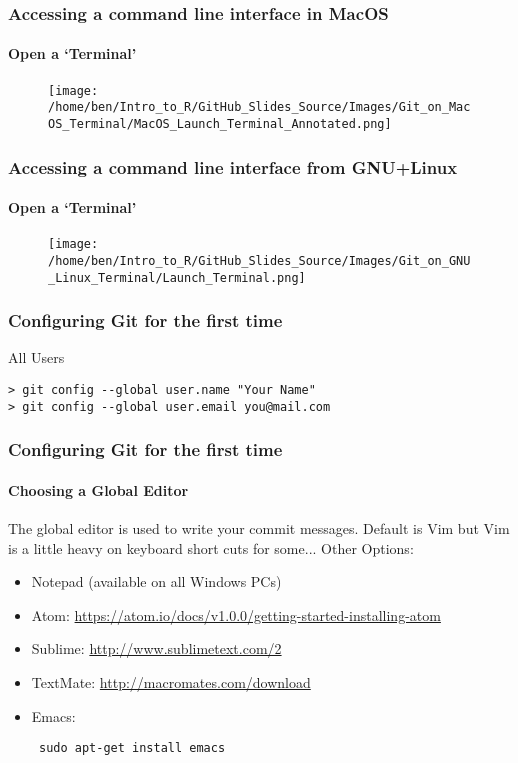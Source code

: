 \documentclass[xcolor=dvipsnames]{beamer}
\begin{document}
\begin{frame}
\frametitle{Accessing a command line interface in MacOS}
\framesubtitle{Open a `Terminal'}
\begin{center}
\begin{figure}
\texttt{[image: /home/ben/Intro\_to\_R/GitHub\_Slides\_Source/Images/Git\_on\_MacOS\_Terminal/MacOS\_Launch\_Terminal\_Annotated.png]} 
\end{figure}
\end{center}
\end{frame}

\begin{frame}
\frametitle{Accessing a command line interface from GNU+Linux}
\framesubtitle{Open a `Terminal'}
\begin{center}
\begin{figure}
\texttt{[image: /home/ben/Intro\_to\_R/GitHub\_Slides\_Source/Images/Git\_on\_GNU\_Linux\_Terminal/Launch\_Terminal.png]}
\end{figure}
\end{center}
\end{frame}

\begin{frame}[fragile]
\frametitle{Configuring Git for the first time}
\begin{block}{All Users}
\begin{lstlisting}
> git config --global user.name "Your Name"
> git config --global user.email you@mail.com
\end{lstlisting}
\end{block}
\end{frame}

\begin{frame}[fragile]
\frametitle{Configuring Git for the first time}
\framesubtitle{Choosing a Global Editor}
The global editor is used to write your commit messages.
\newline
\newline
Default is Vim but Vim is a little heavy on keyboard short cuts for some...
\newline
\newline
Other Options: \begin{itemize}
\item Notepad (available on all Windows PCs)
\item Atom: \url{https://atom.io/docs/v1.0.0/getting-started-installing-atom}
\item Sublime: \url{http://www.sublimetext.com/2}
\item TextMate: \url{http://macromates.com/download}
\item Emacs: \begin{verbatim} sudo apt-get install emacs \end{verbatim} 
\end{itemize}

\end{frame}
\end{document}
